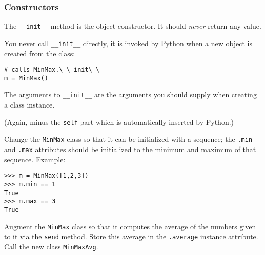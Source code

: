 \documentclass[english,serif,mathserif,xcolor=pdftex,dvipsnames,table]{beamer}
\begin{document}
\begin{frame}[fragile]
  \frametitle{Constructors}

  The \lstinline|__init__| method is the object constructor.
  It should \emph{never} return any value.

  \+ 
  You never call \lstinline|__init__| directly, it is invoked by
  Python when a new object is created from the class:
\begin{lstlisting}
# calls MinMax.\_\_init\_\_
m = MinMax()
\end{lstlisting}

  \+ 
  The arguments to \lstinline|__init__| are the arguments you
  should supply when creating a class instance.

  \+ 
  (Again, minus the \texttt{self} part which is automatically
  inserted by Python.)
\end{frame}








\begin{frame}[fragile]
  \begin{exercise}
    Change the \texttt{MinMax} class so that it can be initialized
    with a sequence; the \texttt{.min} and \texttt{.max} attributes
    should be initialized to the minimum and maximum of that sequence.
    Example:
\begin{lstlisting}
>>> m = MinMax([1,2,3])
>>> m.min == 1
True
>>> m.max == 3
True
\end{lstlisting}
  \end{exercise}

  \begin{exercise}
    Augment the \texttt{MinMax} class so that it computes the
    average of the numbers given to it via the \texttt{send} method.
    Store this average in the \texttt{.average} instance attribute.
    Call the new class \texttt{MinMaxAvg}.
  \end{exercise}
\end{frame}


\end{document}
